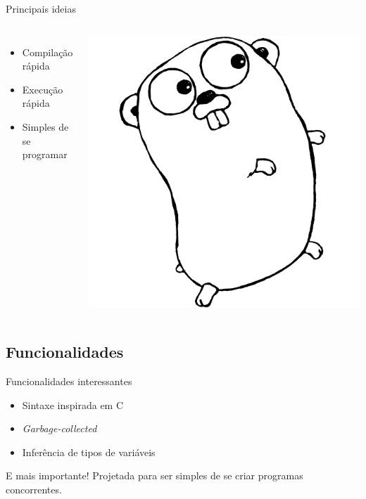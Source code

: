 \documentclass{beamer}
\begin{document}
\begin{frame}
    {Principais ideias}
    \begin{columns}[c]
        \begin{itemize}[<+->]
            \item Compilação rápida
            \item Execução rápida
            \item Simples de se programar
        \end{itemize}

        \centering
        \includegraphics[width=.6\textwidth]{gopherbw.png}
    \end{columns}
\end{frame}

\subsection{Funcionalidades}
\begin{frame}
    {Funcionalidades interessantes}
    \begin{itemize}[<+->]
        \item Sintaxe inspirada em C
        \item {\em Garbage-collected}
        \item Inferência de tipos de variáveis
    \end{itemize}
\end{frame}

\begin{frame}
    {E mais importante!}
    \pause
    Projetada para ser simples de se criar programas concorrentes.
\end{frame}
\end{document}
